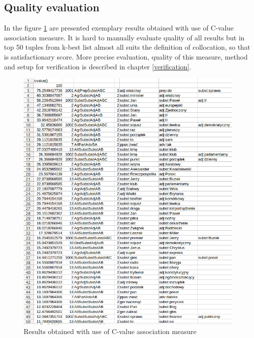 \subsection{Quality evaluation}
In the figure \ref{img_cval} are presented exemplary results obtained with use of C-value association measure. 
It is hard to manually evaluate quality of all results but in top 50 tuples from k-best list almost all suits the definition of collocation, 
so that is satisfactionary score. More precise evaluation, quality of this measure, method and setup for verification 
is described in chapter \ref{verification}.
\begin{figure}[ht]
    \centering
    \includegraphics[scale=0.45]{img/cval_res.png}
    \caption{Results obtained with use of C-value association measure}
    \label{img_cval}
\end{figure}
